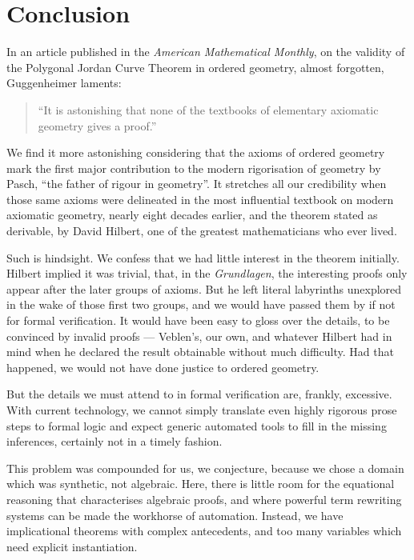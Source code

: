 \chapter{Conclusion}\label{chapter:Conclusion}
In an article published in the \emph{American Mathematical Monthly}, on the validity of the Polygonal Jordan Curve Theorem in ordered geometry, almost forgotten, Guggenheimer laments:
\begin{quote} ``It is astonishing that none of the textbooks of elementary axiomatic geometry gives a proof.''
\end{quote}

We find it more astonishing considering that the axioms of ordered geometry mark the first major contribution to the modern rigorisation of geometry by Pasch, ``the father of rigour in geometry''. It stretches all our credibility when those same axioms were delineated in the most influential textbook on modern axiomatic geometry, nearly eight decades earlier,  and the theorem stated as derivable, by David Hilbert, one of the greatest mathematicians who ever lived.

Such is hindsight. We confess that we had little interest in the theorem initially. Hilbert implied it was trivial, that, in the \emph{Grundlagen}, the interesting proofs only appear after the later groups of axioms. But he left literal labyrinths unexplored in the wake of those first two groups, and we would have passed them by if not for formal verification. It would have been easy to gloss over the details, to be convinced by invalid proofs --- Veblen's, our own, and whatever Hilbert had in mind when he declared the result obtainable without much difficulty. Had that happened, we would not have done justice to ordered geometry.

But the details we must attend to in formal verification are, frankly, excessive. With current technology, we cannot simply translate even highly rigorous prose steps to formal logic and expect generic automated tools to fill in the missing inferences, certainly not in a timely fashion.

This problem was compounded for us, we conjecture, because we chose a domain which was synthetic, not algebraic. Here, there is little room for the equational reasoning that characterises algebraic proofs, and where powerful term rewriting systems can be made the workhorse of automation. Instead, we have implicational theorems with complex antecedents, and too many variables which need explicit instantiation.

